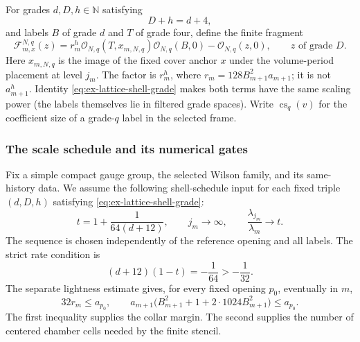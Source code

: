 For grades $d,D,h\in\mathbb N$ satisfying
\begin{equation}\label{eq:ex-lattice-shell-grade}
 D+h=d+4,
\end{equation}
and labels $B$ of grade $d$ and $T$ of grade four, define the finite
fragment
\begin{equation}\label{eq:ex-lattice-shell-fragment}
 \mathcal F_{m,x}^{N,q}(z)
 =r_m^h\mathcal O_{N,q}(T,x_{m,N,q})\mathcal O_{N,q}(B,0)
       -\mathcal O_{N,q}(z,0),
 \qquad z\text{ of grade }D.
\end{equation}
Here $x_{m,N,q}$ is the image of the fixed cover anchor $x$ under the
volume-period placement at level $j_m$. The factor is $r_m^h$, where
$r_m=128B_{m+1}^2a_{m+1}$; it is not $a_{m+1}^h$. Identity
\eqref{eq:ex-lattice-shell-grade} makes both terms have the same scaling
power (the labels themselves lie in filtered grade spaces).
Write $\operatorname{cs}_q(v)$ for the coefficient size of a grade-$q$
label in the selected frame.

\subsubsection{The scale schedule and its numerical gates}

Fix a simple compact gauge group, the selected Wilson family, and its
same-history data. We assume the following shell-schedule input for each fixed triple $(d,D,h)$ satisfying
\eqref{eq:ex-lattice-shell-grade}:
\begin{equation}\label{eq:ex-lattice-shell-schedule}
 t=1+\frac{1}{64(d+12)},\qquad
 j_m\longrightarrow\infty,\qquad
 \frac{\lambda_{j_m}}{\lambda_m}\longrightarrow t.
\end{equation}
The sequence is chosen independently of the reference opening and all
labels. The strict rate condition is
\[
 (d+12)(1-t)=-\frac1{64}>-\frac1{32}.
\]
The separate lightness estimate gives, for every fixed opening $p_0$,
eventually in $m$,
\begin{equation}\label{eq:ex-lattice-shell-lightness}
 32r_m\le a_{p_0},\qquad
 a_{m+1}\bigl(B_{m+1}^{2}+1+2\cdot1024B_{m+1}^{2}\bigr)
       \le a_{p_0}.
\end{equation}
The first inequality supplies the collar margin. The second supplies the
number of centered chamber cells needed by the finite stencil.

